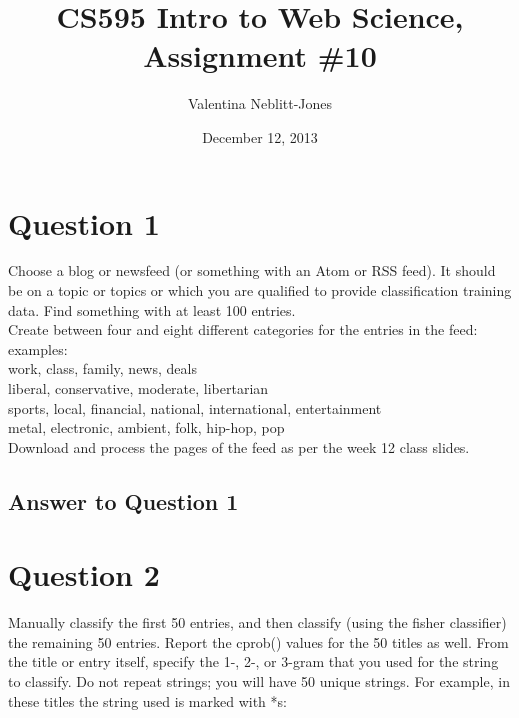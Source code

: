 \documentclass{article}
\begin{document}
\title{CS595 Intro to Web Science, Assignment \#10}
\author{Valentina Neblitt-Jones}
\date{December 12, 2013}
\maketitle

\newpage
\listoftables
\lstlistoflistings
\listoffigures

\newpage
\section*{Question 1}

Choose a blog or newsfeed (or something with an Atom or RSS feed). It should be on a topic or topics or which you are qualified to provide classification training data. Find something with at least 100 entries. \\

Create between four and eight different categories for the entries in the feed: \\

examples: \\

work, class, family, news, deals \\

liberal, conservative, moderate, libertarian \\

sports, local, financial, national, international, entertainment \\

metal, electronic, ambient, folk, hip-hop, pop \\

Download and process the pages of the feed as per the week 12 class slides.

\subsection*{Answer to Question 1}


\newpage
\section*{Question 2}
Manually classify the first 50 entries, and then classify (using the fisher classifier) the remaining 50 entries. Report the cprob() values for the 50 titles as well. From the title or entry itself, specify the 1-, 2-, or 3-gram that you used for the string to classify. Do not repeat strings; you will have 50 unique strings. For example, in these titles the string used is marked with *s: \\
\end{document}
